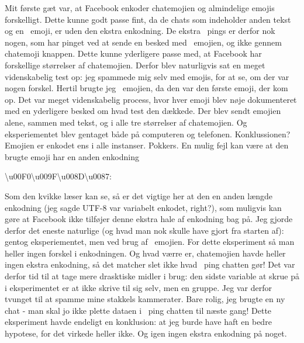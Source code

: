 \begin{article}
Mit første gæt var, at Facebook enkoder chatemojien og almindelige emojis forskelligt. Dette kunne godt passe fint, da de chats som indeholder anden tekst og en \coffee\ emoji, er uden den ekstra enkodning. De ekstra \coffee\ pings er derfor nok nogen, som har pinget ved at sende en besked med \coffee\ emojien, og ikke gennem chatemoji knappen.
Dette kunne yderligere passe med, at Facebook har forskellige størrelser af chatemojien.
Derfor blev naturligvis sat en meget videnskabelig test op: jeg spammede mig selv med emojis, for at se, om der var nogen forskel. Hertil brugte jeg \grapes\ emojien, da den var den første emoji, der kom op. Det var meget videnskabelig process, hvor hver emoji blev nøje dokumenteret med en yderligere besked om hvad test den dækkede. Der blev sendt emojien alene, sammen med tekst, og i alle tre størrelser af chatemojien. Og eksperiementet blev gentaget både på computeren og telefonen. Konklussionen? Emojien er enkodet ens i alle instanser. Pokkers.
En mulig fejl kan være at den brugte emoji har en anden enkodning 
\begin{center}
	\textbackslash u00F0\textbackslash u009F\textbackslash u008D\textbackslash u0087: \grapes
\end{center}
Som den kvikke læser kan se, så er det vigtige her at den en anden længde enkodning (jeg sagde UTF-8 var variabelt enkodet, right?), som muligvis kan gøre at Facebook ikke tilføjer denne ekstra hale af enkodning bag på.
Jeg gjorde derfor det eneste naturlige (og hvad man nok skulle have gjort fra starten af): gentog eksperiementet, men ved brug af \coffee\ emojien.
For dette eksperiment så man heller ingen forskel i enkodningen. Og hvad værre er, chatemojien havde heller ingen ekstra enkodning, så det matcher slet ikke hvad \coffee\ ping chatten gør!
Det var derfor tid til at tage mere drasktiske midler i brug: den sidste variable at skrue på i eksperimentet er at ikke skrive til sig selv, men en gruppe. Jeg var derfor tvunget til at spamme mine stakkels kammerater. Bare rolig, jeg brugte en ny chat - man skal jo ikke plette dataen i \coffee\ ping chatten til næste gang!
Dette eksperiment havde endeligt en konklusion: at jeg burde have haft en bedre hypotese, for det virkede heller ikke. Og igen ingen ekstra enkodning på noget.


\end{article}
